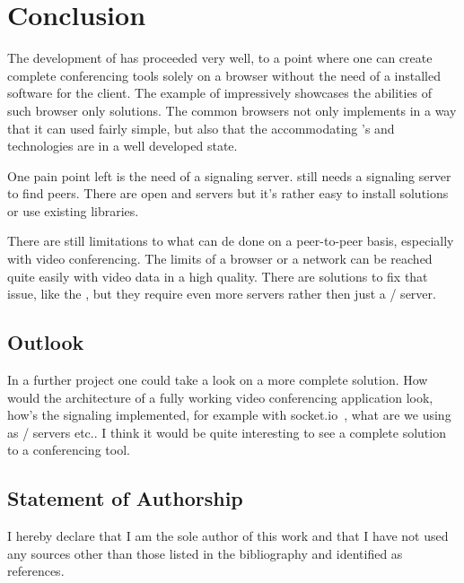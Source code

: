 \clearpage
\chapter{Conclusion}

The development of  has proceeded very well, to a point where one can create complete conferencing tools solely on a browser without the need of a installed software for the client. The example of  impressively showcases the abilities of such browser only solutions. The common browsers not only implements  in a way that it can used fairly simple, but also that the accommodating 's and technologies are in a well developed state.

One pain point left is the need of a signaling server.  still needs a signaling server to find peers. There are open  and  servers but it's rather easy to install  solutions or use existing libraries.

There are still limitations to what can de done on a peer-to-peer basis, especially with video conferencing. The limits of a browser or a network can be reached quite easily with video data in a high quality. There are solutions to fix that issue, like the , but they require even more servers rather then just a / server.

\section{Outlook}
In a further project one could take a look on a more complete solution. How would the architecture of a fully working video conferencing application look, how's the signaling implemented, for example with socket.io~\autocite{socketio}, what are we using as / servers etc.. I think it would be quite interesting to see a complete solution to a conferencing tool.

\section{Statement of Authorship}
I hereby declare that I am the sole author of this work and that I have not used any sources other than those listed in the bibliography and identified as references.